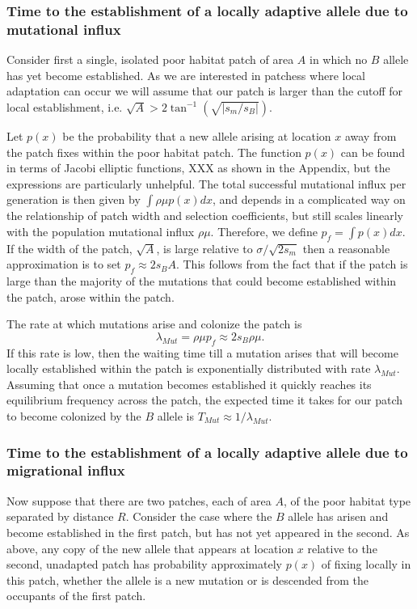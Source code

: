 \documentclass{article}
\begin{document}

\subsubsection{Time to the establishment of a locally adaptive allele
  due to mutational influx}
\label{ss:patchymutation}
Consider first a single, isolated poor habitat patch of area $A$ in
which no $B$ allele has yet become established. As
we are interested in patchess where local adaptation can occur we will assume
that our patch is larger than the cutoff for local
establishment, i.e. $\sqrt{A} > 2 \tan^{-1} (\sqrt{|s_m/s_B|})$.

Let $p(x)$ be the probability that a new allele arising at location
$x$ away from the patch fixes within the poor habitat patch.
The function $p(x)$ can be found in terms of Jacobi elliptic functions,
XXX as shown in the Appendix, but the expressions are particularly unhelpful.
The total successful mutational influx per generation is then given by $\int \rho \mu p(x) dx$,
and depends in a complicated way on the relationship of patch width and selection coefficients,
but still scales linearly with the population mutational influx $\rho \mu$.
Therefore, we define $p_f = \int p(x) dx$.  If the width of the patch, $\sqrt{A}$, is large
relative to $\sigma/\sqrt{2s_m}$ then a reasonable approximation is to
set $p_f \approx 2 s_B A$. This follows from the fact that if the
patch is large than the majority of the mutations that could become
established within the patch, arose within the patch.  

The rate at which mutations arise and colonize the patch is
\begin{equation}
\lambda_{Mut} = \rho \mu p_f \approx 2 s_B \rho \mu.
\end{equation}
If this rate is low,  then the waiting time till a mutation arises that
will become locally established within the patch is exponentially
distributed with rate $\lambda_{Mut}$.  Assuming that once a mutation
becomes established it quickly reaches its equilibrium frequency across the patch, the
 expected time it takes for our patch to become colonized by the $B$
 allele is $T_{Mut} \approx 1/ \lambda_{Mut} $.


\subsubsection{Time to the establishment of a locally adaptive allele
  due to migrational influx}
\label{ss:patchymigration}
Now suppose that there are two patches, each of area $A$, of the poor
habitat type separated by distance $R$. Consider the case where the
$B$ allele has arisen and become established in the first patch, but has not yet appeared in the second.
As above, any copy of the new allele that appears at location $x$ relative to the second, unadapted patch 
has probability approximately $p(x)$ of fixing locally in this patch,
whether the allele is a new mutation or is descended from the
occupants of the first patch.
\end{document}

